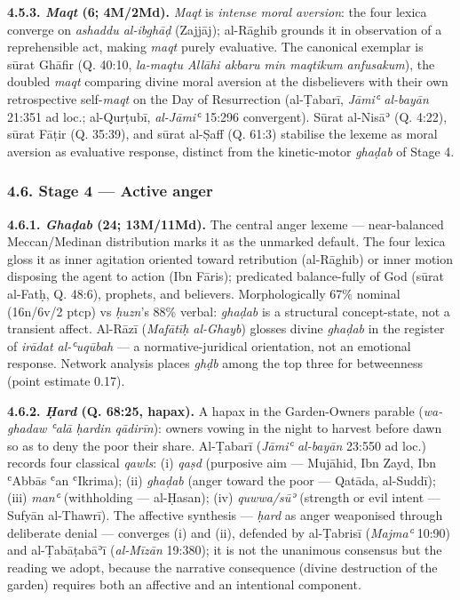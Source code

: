 \documentclass[11pt,a4paper]{article}
\begin{document}
\textbf{4.5.3. \emph{Maqt} (6; 4M/2Md).} \emph{Maqt} is \emph{intense
moral aversion}: the four lexica converge on \emph{ashaddu al-ibghāḍ}
(Zajjāj); al-Rāghib grounds it in observation of a reprehensible act,
making \emph{maqt} purely evaluative. The canonical exemplar is sūrat
Ghāfir (Q. 40:10, \emph{la-maqtu Allāhi akbaru min maqtikum anfusakum}),
the doubled \emph{maqt} comparing divine moral aversion at the
disbelievers with their own retrospective self-\emph{maqt} on the Day of
Resurrection (al-Ṭabarī, \emph{Jāmiʿ al-bayān} 21:351 ad loc.;
al-Qurṭubī, \emph{al-Jāmiʿ} 15:296 convergent). Sūrat al-Nisāʾ (Q.
4:22), sūrat Fāṭir (Q. 35:39), and sūrat al-Ṣaff (Q. 61:3) stabilise the
lexeme as moral aversion as evaluative response, distinct from the
kinetic-motor \emph{ghaḍab} of Stage 4.

\subsubsection{4.6. Stage 4 --- Active
anger}\label{stage-4-active-anger}

\textbf{4.6.1. \emph{Ghaḍab} (24; 13M/11Md).} The central anger lexeme
--- near-balanced Meccan/Medinan distribution marks it as the unmarked
default. The four lexica gloss it as inner agitation oriented toward
retribution (al-Rāghib) or inner motion disposing the agent to action
(Ibn Fāris); predicated balance-fully of God (sūrat al-Fatḥ, Q. 48:6),
prophets, and believers. Morphologically 67\% nominal (16n/6v/2 ptcp) vs
\emph{ḥuzn}'s 88\% verbal: \emph{ghaḍab} is a structural concept-state,
not a transient affect. Al-Rāzī (\emph{Mafātīḥ al-Ghayb}) glosses divine
\emph{ghaḍab} in the register of \emph{irādat al-ʿuqūbah} --- a
normative-juridical orientation, not an emotional response. Network
analysis places \emph{ghḍb} among the top three for betweenness (point
estimate 0.17).

\textbf{4.6.2. \emph{Ḥard} (Q. 68:25, hapax).} A hapax in the
Garden-Owners parable (\emph{wa-ghadaw ʿalā ḥardin qādirīn}): owners
vowing in the night to harvest before dawn so as to deny the poor their
share. Al-Ṭabarī (\emph{Jāmiʿ al-bayān} 23:550 ad loc.) records four
classical \emph{qawls}: (i) \emph{qaṣd} (purposive aim --- Mujāhid, Ibn
Zayd, Ibn ʿAbbās ʿan ʿIkrima); (ii) \emph{ghaḍab} (anger toward the poor
--- Qatāda, al-Suddī); (iii) \emph{manʿ} (withholding --- al-Ḥasan);
(iv) \emph{quwwa/sūʾ} (strength or evil intent --- Sufyān al-Thawrī).
The affective synthesis --- \emph{ḥard} as anger weaponised through
deliberate denial --- converges (i) and (ii), defended by al-Ṭabrisī
(\emph{Majmaʿ} 10:90) and al-Ṭabāṭabāʾī (\emph{al-Mīzān} 19:380); it is
not the unanimous consensus but the reading we adopt, because the
narrative consequence (divine destruction of the garden) requires both
an affective and an intentional component.
\end{document}

